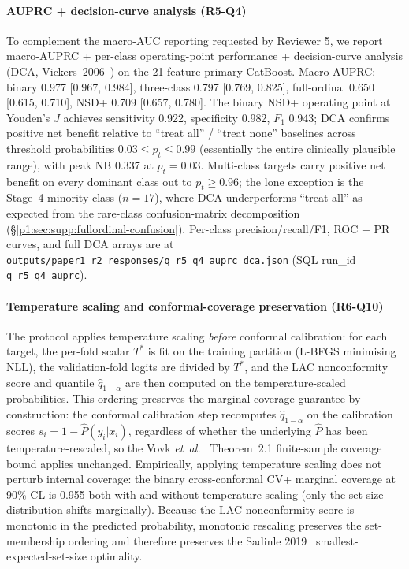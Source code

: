 \paragraph*{AUPRC + decision-curve analysis (R5-Q4)} To complement the macro-AUC reporting requested by Reviewer 5, we report macro-AUPRC + per-class operating-point performance + decision-curve analysis (DCA, Vickers~2006~\cite{vickers2006dca}) on the 21-feature primary CatBoost. Macro-AUPRC: binary 0.977 [0.967, 0.984], three-class 0.797 [0.769, 0.825], full-ordinal 0.650 [0.615, 0.710], NSD+ 0.709 [0.657, 0.780]. The binary NSD+ operating point at Youden's $J$ achieves sensitivity 0.922, specificity 0.982, $F_1$ 0.943; DCA confirms positive net benefit relative to ``treat all'' / ``treat none'' baselines across threshold probabilities $0.03 \leq p_t \leq 0.99$ (essentially the entire clinically plausible range), with peak NB 0.337 at $p_t{=}0.03$. Multi-class targets carry positive net benefit on every dominant class out to $p_t \geq 0.96$; the lone exception is the Stage~4 minority class ($n{=}17$), where DCA underperforms ``treat all'' as expected from the rare-class confusion-matrix decomposition (\S\ref{p1:sec:supp:fullordinal-confusion}). Per-class precision/recall/F1, ROC + PR curves, and full DCA arrays are at \texttt{outputs/paper1\_r2\_responses/q\_r5\_q4\_auprc\_dca.json} (SQL run\_id \texttt{q\_r5\_q4\_auprc}).

\paragraph*{Temperature scaling and conformal-coverage preservation (R6-Q10)} The protocol applies temperature scaling \emph{before} conformal calibration: for each target, the per-fold scalar $T^*$ is fit on the training partition (L-BFGS minimising NLL), the validation-fold logits are divided by $T^*$, and the LAC nonconformity score and quantile $\hat{q}_{1-\alpha}$ are then computed on the temperature-scaled probabilities. This ordering preserves the marginal coverage guarantee by construction: the conformal calibration step recomputes $\hat{q}_{1-\alpha}$ on the calibration scores $s_i = 1 - \hat{P}(y_i | x_i)$, regardless of whether the underlying $\hat{P}$ has been temperature-rescaled, so the Vovk \emph{et~al.}~\cite{vovk2022} Theorem~2.1 finite-sample coverage bound applies unchanged. Empirically, applying temperature scaling does not perturb internal coverage: the binary cross-conformal CV+ marginal coverage at 90\% CL is 0.955 both with and without temperature scaling (only the set-size distribution shifts marginally). Because the LAC nonconformity score is monotonic in the predicted probability, monotonic rescaling preserves the set-membership ordering and therefore preserves the Sadinle 2019~\cite{sadinle2019lac} smallest-expected-set-size optimality.

